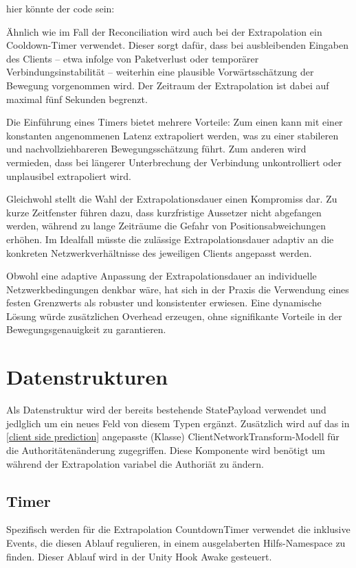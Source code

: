 \begin{enumerate}
hier könnte der code sein:

Ähnlich wie im Fall der Reconciliation wird auch bei der Extrapolation ein Cooldown-Timer verwendet. Dieser sorgt dafür, dass bei ausbleibenden Eingaben des Clients – etwa infolge von Paketverlust oder temporärer Verbindungsinstabilität – weiterhin eine plausible Vorwärtsschätzung der Bewegung vorgenommen wird. Der Zeitraum der Extrapolation ist dabei auf maximal fünf Sekunden begrenzt.

Die Einführung eines Timers bietet mehrere Vorteile: Zum einen kann mit einer konstanten angenommenen Latenz extrapoliert werden, was zu einer stabileren und nachvollziehbareren Bewegungsschätzung führt. Zum anderen wird vermieden, dass bei längerer Unterbrechung der Verbindung unkontrolliert oder unplausibel extrapoliert wird.

Gleichwohl stellt die Wahl der Extrapolationsdauer einen Kompromiss dar. Zu kurze Zeitfenster führen dazu, dass kurzfristige Aussetzer nicht abgefangen werden, während zu lange Zeiträume die Gefahr von Positionsabweichungen erhöhen. Im Idealfall müsste die zulässige Extrapolationsdauer adaptiv an die konkreten Netzwerkverhältnisse des jeweiligen Clients angepasst werden.

Obwohl eine adaptive Anpassung der Extrapolationsdauer an individuelle Netzwerkbedingungen denkbar wäre, hat sich in der Praxis die Verwendung eines festen Grenzwerts als robuster und konsistenter erwiesen. Eine dynamische Lösung würde zusätzlichen Overhead erzeugen, ohne signifikante Vorteile in der Bewegungsgenauigkeit zu garantieren.


\newpage

\section{Datenstrukturen}
Als Datenstruktur wird der bereits bestehende StatePayload verwendet und jedlglich um ein neues Feld von diesem Typen ergänzt. Zusätzlich wird auf das in \ref{client side prediction} angepasste (Klasse) ClientNetworkTransform-Modell für die Authoritätenänderung zugegriffen. Diese Komponente wird benötigt um während der Extrapolation variabel die Authoriät zu ändern.

\subsection{Timer}
Spezifisch werden für die Extrapolation CountdownTimer verwendet die inklusive Events, die diesen Ablauf regulieren, in einem ausgelaberten Hilfs-Namespace zu finden. Dieser Ablauf wird in der Unity Hook Awake gesteuert.


\end{enumerate}
